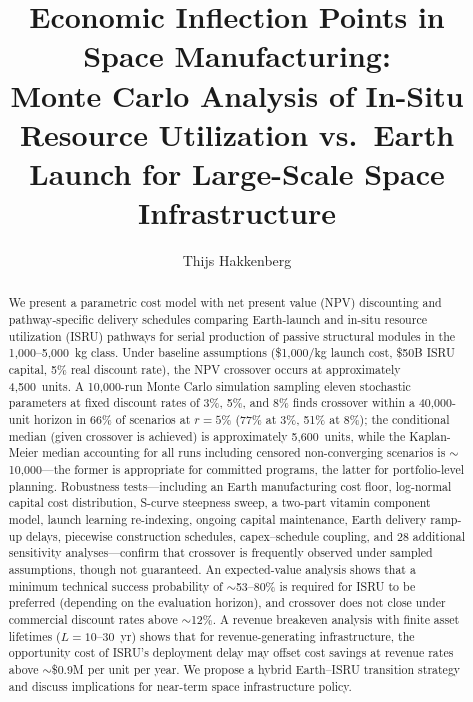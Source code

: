 \documentclass[preprint,12pt]{elsarticle}
\begin{document}
\begin{frontmatter}

\title{Economic Inflection Points in Space Manufacturing:\\ Monte Carlo Analysis of In-Situ Resource Utilization vs.\ Earth Launch for Large-Scale Space Infrastructure}

\author[dyson]{Thijs Hakkenberg}

\address[dyson]{Project Dyson, Open Research Initiative}

\begin{abstract}
We present a parametric cost model with net present value (NPV) discounting and pathway-specific delivery schedules comparing Earth-launch and in-situ resource utilization (ISRU) pathways for serial production of passive structural modules in the 1{,}000--5{,}000~kg class. Under baseline assumptions (\$1{,}000/kg launch cost, \$50B ISRU capital, 5\% real discount rate), the NPV crossover occurs at approximately 4{,}500~units. A 10{,}000-run Monte Carlo simulation sampling eleven stochastic parameters at fixed discount rates of 3\%, 5\%, and 8\% finds crossover within a 40{,}000-unit horizon in 66\% of scenarios at $r = 5\%$ (77\% at 3\%, 51\% at 8\%); the conditional median (given crossover is achieved) is approximately 5{,}600~units, while the Kaplan-Meier median accounting for all runs including censored non-converging scenarios is $\sim$10{,}000---the former is appropriate for committed programs, the latter for portfolio-level planning. Robustness tests---including an Earth manufacturing cost floor, log-normal capital cost distribution, S-curve steepness sweep, a two-part vitamin component model, launch learning re-indexing, ongoing capital maintenance, Earth delivery ramp-up delays, piecewise construction schedules, capex--schedule coupling, and 28 additional sensitivity analyses---confirm that crossover is frequently observed under sampled assumptions, though not guaranteed. An expected-value analysis shows that a minimum technical success probability of $\sim$53--80\% is required for ISRU to be preferred (depending on the evaluation horizon), and crossover does not close under commercial discount rates above $\sim$12\%. A revenue breakeven analysis with finite asset lifetimes ($L = 10$--$30$~yr) shows that for revenue-generating infrastructure, the opportunity cost of ISRU's deployment delay may offset cost savings at revenue rates above $\sim$\$0.9M per unit per year. We propose a hybrid Earth--ISRU transition strategy and discuss implications for near-term space infrastructure policy.
\end{abstract}


\end{frontmatter}
\end{document}
